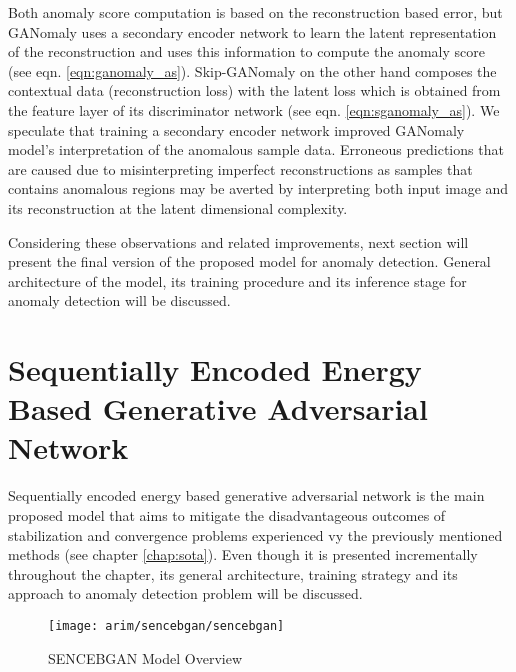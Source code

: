 Both anomaly score computation is based on the reconstruction based error, but GANomaly uses a
secondary encoder network to learn the latent representation of the reconstruction and uses this
information to compute the anomaly score (see eqn. \ref{eqn:ganomaly_as}). Skip-GANomaly on the
other hand composes the contextual data (reconstruction loss) with the latent loss which is obtained
from the feature layer of its discriminator network (see eqn. \ref{eqn:sganomaly_as}). We speculate
that training a secondary encoder network improved GANomaly model's interpretation of the anomalous
sample data. Erroneous predictions that are caused due to misinterpreting imperfect reconstructions
as samples that contains anomalous regions may be averted by interpreting both input image and its
reconstruction at the latent dimensional complexity. 

Considering these observations and related improvements, next section will present the final version of the proposed 
model for anomaly detection. General architecture of the model, its training procedure and its inference stage for anomaly 
detection will be discussed.

\section{Sequentially Encoded Energy Based Generative Adversarial Network}
\label{sec:sencebgan}

Sequentially encoded energy based generative adversarial network is the main proposed model that aims to mitigate the disadvantageous 
outcomes of stabilization and convergence problems experienced vy the previously mentioned methods (see chapter \ref{chap:sota}).
Even though it is presented incrementally throughout the chapter, its general architecture, training strategy and its approach to 
anomaly detection problem will be discussed.
\begin{figure}[h!]
	\centering
	\texttt{[image: arim/sencebgan/sencebgan]}
	\caption{SENCEBGAN Model Overview }
	\label{fig:sencebgan_model}
\end{figure}

